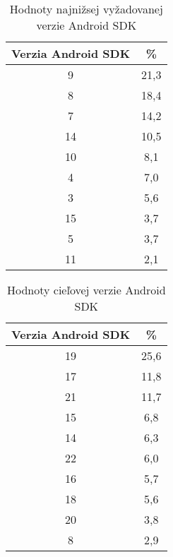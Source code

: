 \documentclass[
  digital, %
  table,   %
  lof,     %
  lot,     %
]{fithesis3}
\begin{document}
\begin{table}[htb]
\centering
  \begin{tabular}{|c c|}
    \hline
    Verzia Android SDK & \% \\\hline\hline
    9 & 21,3 \\
    8 & 18,4 \\
    7 & 14,2 \\
    14 & 10,5 \\
    10 & 8,1 \\
    4 & 7,0 \\
    3 & 5,6 \\
    15 & 3,7 \\
    5 & 3,7 \\
    11 & 2,1\\
    \hline
  \end{tabular}
  \caption{Hodnoty najnižsej vyžadovanej verzie Android SDK}
  \label{tab:minSdk}
\end{table}

\begin{table}[htb]
\centering
  \begin{tabular}{|c c|}
    \hline
    Verzia Android SDK & \% \\\hline\hline
    19 & 25,6 \\
    17 & 11,8 \\
    21 & 11,7 \\
    15 & 6,8 \\
    14 & 6,3 \\
    22 & 6,0\\
    16 & 5,7 \\
    18 & 5,6 \\
    20 & 3,8 \\
    8 & 2,9\\
    \hline
  \end{tabular}
  \caption{Hodnoty cieľovej verzie Android SDK}
  \label{tab:targetSdk}
\end{table}
\end{document}
